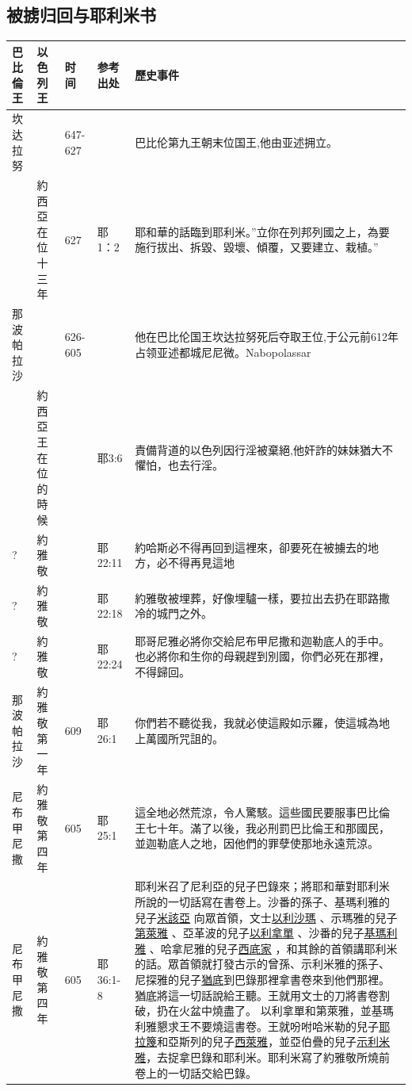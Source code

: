 \subsection{被掳归回与耶利米书}
\begin{table}[!hbp]
\centering 
\begin{tabular}{|p{1.8cm}|p{2cm}|p{1.5cm}|p{1.7cm}|p{8.5cm}| }
\hline
\hline
巴比倫王 &以色列王  & 时间 &参考出处 & 歷史事件   \\\hline
坎达拉努& &647-627 & &巴比伦第九王朝末位国王,他由亚述拥立。 \\\hline
&約西亞在位十三年&627   &耶1：2&耶和華的話臨到耶利米。''立你在列邦列國之上，為要施行拔出、拆毀、毀壞、傾覆，又要建立、栽植。''  \\\hline
那波帕拉沙 & &626-605& \cite{Nabopolassar}   &他在巴比伦国王坎达拉努死后夺取王位,于公元前612年占领亚述都城尼尼微。Nabopolassar \\\hline
 & 約西亞王在位的時候 &  &耶3:6  &  責備背道的以色列因行淫被棄絕,他奸詐的妹妹猶大不懼怕，也去行淫。 \\\hline
 
  ?& 約雅敬&  &耶22:11  &約哈斯必不得再回到這裡來，卻要死在被擄去的地方，必不得再見這地 \\\hline
  ?& 約雅敬&  &耶22:18&  約雅敬被埋葬，好像埋驢一樣，要拉出去扔在耶路撒冷的城門之外。 \\\hline
    ?& 約雅敬&  &耶22:24  &  耶哥尼雅必將你交給尼布甲尼撒和迦勒底人的手中。也必將你和生你的母親趕到別國，你們必死在那裡，不得歸回。\\\hline
那波帕拉沙 &約雅敬第一年 &609&耶26:1  &你們若不聽從我，我就必使這殿如示羅，使這城為地上萬國所咒詛的。               \\\hline  
    尼布甲尼撒 & 約雅敬第四年& 605 &耶25:1  &這全地必然荒涼，令人驚駭。這些國民要服事巴比倫王七十年。滿了以後，我必刑罰巴比倫王和那國民，並迦勒底人之地，因他們的罪孽使那地永遠荒涼。 \\\hline
       尼布甲尼撒 & 約雅敬第四年& 605 &耶36:1-8  &耶利米召了尼利亞的兒子巴錄來；將耶和華對耶利米所說的一切話寫在書卷上。沙番的孫子、基瑪利雅的兒子\underline{米該亞} 向眾首領，文士\underline{以利沙瑪} 、示瑪雅的兒子\underline{第萊雅} 、亞革波的兒子\underline{以利拿單} 、沙番的兒子\underline{基瑪利雅} 、哈拿尼雅的兒子\underline{西底家} ，和其餘的首領講耶利米的話。眾首領就打發古示的曾孫、示利米雅的孫子、尼探雅的兒子\underline{猶底}到巴錄那裡拿書卷來到他們那裡。猶底將這一切話說給王聽。王就用文士的刀將書卷割破，扔在火盆中燒盡了。 以利拿單和第萊雅，並基瑪利雅懇求王不要燒這書卷。王就吩咐哈米勒的兒子\underline{耶拉篾}和亞斯列的兒子\underline{西萊雅}，並亞伯疊的兒子\underline{示利米雅}，去捉拿巴錄和耶利米。耶利米寫了約雅敬所燒前卷上的一切話交給巴錄。 \\\hline
  

\end{tabular}
\end{table}
